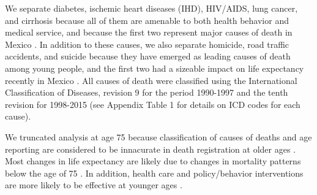 \documentclass[11.5pt]{article}
\begin{document}
\begin{spacing}{1.5}

We separate diabetes, ischemic heart diseases (IHD), HIV/AIDS, lung
cancer, and cirrhosis because all of them are amenable to both health behavior
and medical service, and because the first two represent major causes of death
in Mexico \citep{canudas2014}. In addition to these causes, we also separate
homicide, road traffic accidents, and suicide because they have emerged as
leading causes of death among young people, and the first two had a sizeable
impact on life expectancy recently in Mexico \citep{canudas2014}. All causes of death were classified using the International Classification of Diseases, revision 9 for the period 1990-1997 and the tenth revision for 1998-2015 (see Appendix Table 1 for details on ICD codes for each cause).

We truncated analysis at age 75 because classification of causes of deaths and age reporting are considered to be innacurate in death registration at older ages \citep{tobias2001}. Most changes in life expectancy are likely due to changes in mortality patterns below the age of 75 \citep{Aburto2015}. In addition, health care and policy/behavior interventions are more likely to be effective at younger ages \citep{elo2014}.


\end{spacing}
\end{document}
